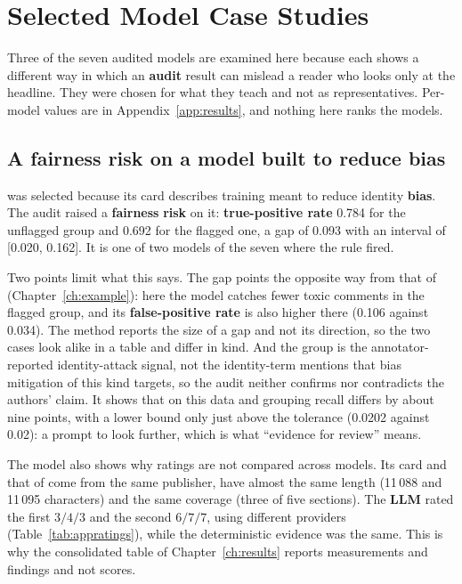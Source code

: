 \chapter{Selected Model Case Studies}\label{ch:cases}

Three of the seven audited models are examined here because each shows a different way in which an \textbf{audit} result can mislead a reader who looks only at the headline. They were chosen for what they teach and not as representatives. Per-model values are in Appendix~\ref{app:results}, and nothing here ranks the models.

\section{A fairness risk on a model built to reduce bias}
 was selected because its card describes training meant to reduce identity \textbf{bias}. The audit raised a \textbf{fairness} \textbf{risk} on it: \textbf{true-positive rate} 0.784 for the unflagged group and 0.692 for the flagged one, a gap of 0.093 with an interval of [0.020, 0.162]. It is one of two models of the seven where the rule fired.

Two points limit what this says. The gap points the opposite way from that of  (Chapter~\ref{ch:example}): here the model catches fewer toxic comments in the flagged group, and its \textbf{false-positive rate} is also higher there (0.106 against 0.034). The method reports the size of a gap and not its direction, so the two cases look alike in a table and differ in kind. And the group is the annotator-reported identity-attack signal, not the identity-term mentions that bias mitigation of this kind targets, so the audit neither confirms nor contradicts the authors' claim. It shows that on this data and grouping recall differs by about nine points, with a lower bound only just above the tolerance (0.0202 against 0.02): a prompt to look further, which is what ``evidence for review'' means.

The model also shows why ratings are not compared across models. Its card and that of  come from the same publisher, have almost the same length (11\,088 and 11\,095 characters) and the same coverage (three of five sections). The \textbf{LLM} rated the first $3/4/3$ and the second $6/7/7$, using different providers (Table~\ref{tab:appratings}), while the deterministic evidence was the same. This is why the consolidated table of Chapter~\ref{ch:results} reports measurements and findings and not scores.

